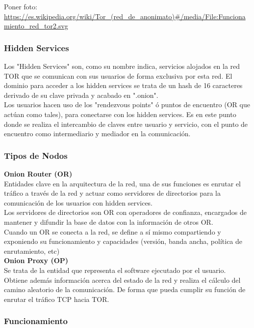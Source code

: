 Poner foto: \url {https://es.wikipedia.org/wiki/Tor_(red_de_anonimato)#/media/File:Funcionamiento_red_tor2.svg}

\subsubsection {Hidden Services}

Los "Hidden Services" son, como su nombre indica, servicios alojados en la red TOR que se comunican con sus usuarios de forma exclusiva por esta red. El dominio para acceder a los hidden services se trata de un hash de 16 caracteres derivado de su clave privada y acabado en ".onion". \\

Los usuarios hacen uso de los "rendezvous points" ó puntos de encuentro (OR que actúan como tales), para conectarse con los hidden services. Es en este punto donde se realiza el intercambio de claves entre usuario y servicio, con el punto de encuentro como intermediario y mediador en la comunicación. \\ 


\subsubsection {Tipos de Nodos}

\textbf {Onion Router (OR)} \\
Entidades clave en la arquitectura de la red, una de sus funciones es enrutar el tráfico a través de la red y actuar como servidores de directorios para la comunicación de los usuarios con hidden services. \\ Los servidores de directorios son OR con operadores de confianza, encargados de mantener y difundir la base de datos con la información de otros OR. \\

Cuando un OR se conecta a la red, se define a sí mismo compartiendo y exponiendo su funcionamiento y capacidades (versión, banda ancha, política de enrutamiento, etc) \\

\textbf {Onion Proxy (OP)} \\
Se trata de la entidad que representa el software ejecutado por el usuario. Obtiene además información acerca del estado de la red y realiza el cálculo del camino aleatorio de la comunicación. De forma que pueda cumplir su función de enrutar el tráfico TCP hacia TOR.

\subsubsection {Funcionamiento}

